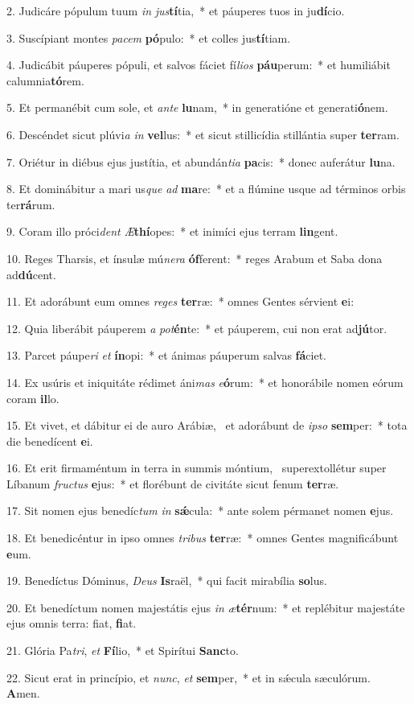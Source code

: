 2. Judicáre pópulum tuum \textit{in} \textit{jus}\textbf{tí}tia,~*  et páuperes tuos in ju\textbf{dí}cio.\

3. Suscípiant montes \textit{pa}\textit{cem} \textbf{pó}pulo:~*  et colles jus\textbf{tí}tiam.\

4. Judicábit páuperes pópuli, et salvos fáciet fí\textit{li}\textit{os} \textbf{páu}perum:~*  et humiliábit calumnia\textbf{tó}rem.\

5. Et permanébit cum sole, et \textit{an}\textit{te} \textbf{lu}nam,~*  in generatióne et generati\textbf{ó}nem.\

6. Descéndet sicut plúvi\textit{a} \textit{in} \textbf{vel}lus:~*  et sicut stillicídia stillántia super \textbf{ter}ram.\

7. Oriétur in diébus ejus justítia, et abundán\textit{ti}\textit{a} \textbf{pa}cis:~*  donec auferátur \textbf{lu}na.\

8. Et dominábitur a mari us\textit{que} \textit{ad} \textbf{ma}re:~*  et a flúmine usque ad términos orbis ter\textbf{rá}rum.\

9. Coram illo próci\textit{dent} \textit{Æ}\textbf{thí}opes:~*  et inimíci ejus terram \textbf{lin}gent.\

10. Reges Tharsis, et ínsulæ mú\textit{ne}\textit{ra} \textbf{óf}ferent:~*  reges Arabum et Saba dona ad\textbf{dú}cent.\

11. Et adorábunt eum omnes \textit{re}\textit{ges} \textbf{ter}ræ:~*  omnes Gentes sérvient \textbf{e}i:\

12. Quia liberábit páuperem \textit{a} \textit{pot}\textbf{én}te:~*  et páuperem, cui non erat ad\textbf{jú}tor.\

13. Parcet páupe\textit{ri} \textit{et} \textbf{ín}opi:~*  et ánimas páuperum salvas \textbf{fá}ciet.\

14. Ex usúris et iniquitáte rédimet áni\textit{mas} \textit{e}\textbf{ó}rum:~*  et honorábile nomen eórum coram \textbf{il}lo.\

15. Et vivet, et dábitur ei de auro Arábiæ, \dag\  et adorábunt de \textit{ip}\textit{so} \textbf{sem}per:~*  tota die benedícent \textbf{e}i.\

16. Et erit firmaméntum in terra in summis móntium, \dag\  superextollétur super Líbanum \textit{fruc}\textit{tus} \textbf{e}jus:~*  et florébunt de civitáte sicut fenum \textbf{ter}ræ.\

17. Sit nomen ejus benedíc\textit{tum} \textit{in} \textbf{sǽ}cula:~*  ante solem pérmanet nomen \textbf{e}jus.\

18. Et benedicéntur in ipso omnes \textit{tri}\textit{bus} \textbf{ter}ræ:~*  omnes Gentes magnificábunt \textbf{e}um.\

19. Benedíctus Dóminus, \textit{De}\textit{us} \textbf{Is}raël,~*  qui facit mirabília \textbf{so}lus.\

20. Et benedíctum nomen majestátis ejus \textit{in} \textit{æ}\textbf{tér}num:~*  et replébitur majestáte ejus omnis terra: fiat, \textbf{fi}at.\

21. Glória Pa\textit{tri}, \textit{et} \textbf{Fí}lio,~*  et Spirítui \textbf{Sanc}to.\

22. Sicut erat in princípio, et \textit{nunc}, \textit{et} \textbf{sem}per,~*  et in sǽcula sæculórum. \textbf{A}men.\

